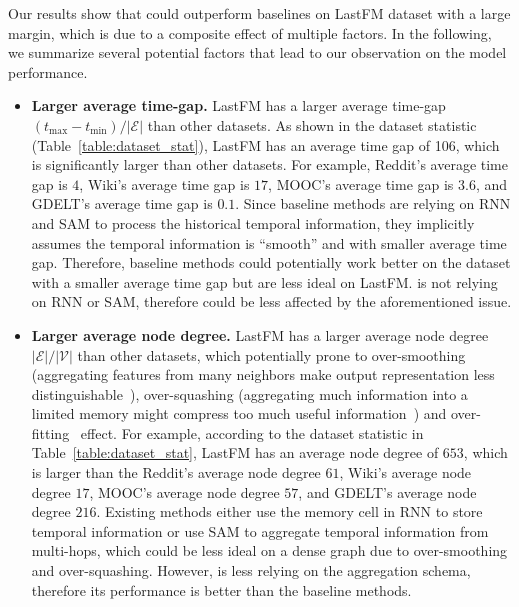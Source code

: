 Our results show that \our could outperform baselines on LastFM dataset with a large margin, which is due to a composite effect of multiple factors. In the following, we summarize several potential factors that lead to our observation on the model performance.
\begin{itemize} [noitemsep,topsep=0pt,leftmargin=5mm ]
    \item \textbf{Larger average time-gap.} LastFM has a larger average time-gap $(t_{\max} - t_{\min})/|\mathcal{E}|$ than other datasets. As shown in the dataset statistic (Table~\ref{table:dataset_stat}), LastFM has an average time gap of 106, which is significantly larger than other datasets. For example, Reddit's average time gap is $4$, Wiki's average time gap is $17$, MOOC's average time gap is $3.6$, and GDELT's average time gap is $0.1$. Since baseline methods are relying on RNN and SAM to process the historical temporal information, they implicitly assumes the temporal information is ``smooth'' and with smaller average time gap. Therefore, baseline methods could potentially work better on the dataset with a smaller average time gap but are less ideal on LastFM. \our is not relying on RNN or SAM, therefore could be less affected by the aforementioned issue.
    \item \textbf{Larger average node degree.} LastFM has a larger average node degree $|\mathcal{E}|/|\mathcal{V}|$ than other datasets, which potentially prone to over-smoothing (aggregating features from many neighbors make output representation less distinguishable~\cite{li2018deeper}), over-squashing (aggregating much information into a limited memory might compress too much useful information~\cite{alon2020bottleneck}) and over-fitting~\cite{cong2021provable} effect. For example, according to the dataset statistic in Table~\ref{table:dataset_stat}, LastFM has an average node degree of $653$, which is larger than the Reddit's average node degree $61$, Wiki's average node degree $17$, MOOC's average node degree $57$, and GDELT's average node degree $216$. Existing methods either use the memory cell in RNN to store temporal information or use SAM to aggregate temporal information from multi-hops, which could be less ideal on a dense graph due to over-smoothing and over-squashing. However, \our is less relying on the aggregation schema, therefore its performance is better than the baseline methods. 

\end{itemize}
